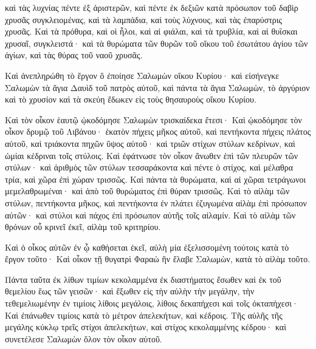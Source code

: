 {καὶ τὰς λυχνίας πέντε ἐξ ἀριστερῶν, καὶ πέντε ἐκ δεξιῶν κατὰ πρόσωπον τοῦ δαβὶρ χρυσᾶς συγκλειομένας, καὶ τὰ λαμπάδια, καὶ τοὺς λύχνους, καὶ τὰς ἐπαρύστρις χρυσᾶς.
Καὶ τὰ πρόθυρα, καὶ οἱ ἧλοι, καὶ αἱ φιάλαι, καὶ τὰ τρυβλία, καὶ αἱ θυΐσκαι χρυσαῖ, συγκλειστά· καὶ τὰ θυρώματα τῶν θυρῶν τοῦ οἴκου τοῦ ἐσωτάτου ἁγίου τῶν ἁγίων, καὶ τὰς θύρας τοῦ ναοῦ χρυσᾶς.
\par }{\PP {}Καὶ ἀνεπληρώθη τὸ ἔργον ὃ ἐποίησε Σαλωμὼν οἴκου Κυρίου· καὶ εἰσήνεγκε Σαλωμὼν τὰ ἅγια Δαυὶδ τοῦ πατρὸς αὐτοῦ, καὶ πάντα τὰ ἅγια Σαλωμὼν, τὸ ἀργύριον καὶ τὸ χρυσίον καὶ τὰ σκεύη ἔδωκεν εἰς τοὺς θησαυροὺς οἴκου Κυρίου.
\par }{\PP {}Καὶ τὸν οἶκον ἑαυτῷ ᾠκοδόμησε Σαλωμὼν τρισκαίδεκα ἔτεσι·
Καὶ ᾠκοδόμησε τὸν οἶκον δρυμῷ τοῦ Λιβάνου· ἑκατὸν πήχεις μῆκος αὐτοῦ, καὶ πεντήκοντα πήχεις πλάτος αὐτοῦ, καὶ τριάκοντα πηχῶν ὕψος αὐτοῦ· καὶ τριῶν στίχων στύλων κεδρίνων, καὶ ὠμίαι κέδριναι τοῖς στύλοις.
Καὶ ἐφάτνωσε τὸν οἶκον ἄνωθεν ἐπὶ τῶν πλευρῶν τῶν στύλων· καὶ ἀριθμὸς τῶν στύλων τεσσαράκοντα καὶ πέντε ὁ στίχος,
καὶ μέλαθρα τρία, καὶ χῶρα ἐπὶ χώραν τρισσῶς.
Καὶ πάντα τὰ θυρώματα, καὶ αἱ χῶραι τετράγωνοι μεμελαθρωμέναι· καὶ ἀπὸ τοῦ θυρώματος ἐπὶ θύραν τρισσῶς.
Καὶ τὸ αἰλὰμ τῶν στύλων, πεντήκοντα μῆκος, καὶ πεντήκοντα ἐν πλάτει ἐζυγωμένα αἰλὰμ ἐπὶ πρόσωπον αὐτῶν· καὶ στύλοι καὶ πάχος ἐπὶ πρόσωπον αὐτῆς τοῖς αἰλαμίν.
Καὶ τὸ αἰλὰμ τῶν θρόνων οὗ κρινεῖ ἐκεῖ, αἰλὰμ τοῦ κριτηρίου.
\par }{\PP {}Καὶ ὁ οἶκος αὐτῶν ἐν ᾧ καθήσεται ἐκεῖ, αὐλὴ μία ἐξελισσομένη τούτοις κατὰ τὸ ἔργον τοῦτο· Καὶ οἶκον τῇ θυγατρὶ Φαραὼ ἣν ἔλαβε Σαλωμὼν, κατὰ τὸ αἰλὰμ τοῦτο.
\par }{\PP {}Πάντα ταῦτα ἐκ λίθων τιμίων κεκολαμμένα ἐκ διαστήματος ἔσωθεν καὶ ἐκ τοῦ θεμελίου ἕως τῶν γεισῶν· καὶ ἔξωθεν εἰς τὴν αὐλὴν τὴν μεγάλην,
τὴν τεθεμελιωμένην ἐν τιμίοις λίθοις μεγάλοις, λίθοις δεκαπήχεσι καὶ τοῖς ὀκταπήχεσι·
Καὶ ἐπάνωθεν τιμίοις κατὰ τὸ μέτρον ἀπελεκήτων, καὶ κέδροις.
Τῆς αὐλῆς τῆς μεγάλης κύκλῳ τρεῖς στίχοι ἀπελεκήτων, καὶ στίχος κεκολαμμένης κέδρου·
καὶ συνετέλεσε Σαλωμὼν ὅλον τὸν οἶκον αὐτοῦ.

}
